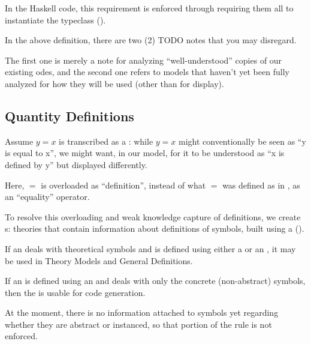 In the Haskell code, this requirement is enforced through requiring them all to
instantiate the \Express{} typeclass ().

\currentModelKindsHaskell{}

In the above \ModelKinds{} definition, there are two (2) TODO notes that you may
disregard.

The first one is merely a note for analyzing ``well-understood'' copies of our
existing \acsp{ode}, and the second one refers to models that haven't yet been
fully analyzed for how they will be used (other than for display).

\subsection{Quantity Definitions}

\currentQDefinitionHaskell{}

Assume \(y = x\) is transcribed as a \RelationConcept{}: while \(y = x\) might
conventionally be seen as ``y is equal to x'', we might want, in our model, for
it to be understood as ``x is defined by y'' but displayed differently.

Here, \(=\) is overloaded as ``definition'', instead of what \(=\) was defined
as in \Expr{}, as an ``equality'' operator.

To resolve this overloading and weak knowledge capture of definitions, we create
\EquationalModel{}s: theories that contain information about definitions of
symbols, built using a \QDefinition{} ().

If an \EquationalModel{} deals with theoretical symbols and is defined using
either a \ModelExpr{} or an \Expr{}, it may be used in Theory Models and General
Definitions.

If an \EquationalModel{} is defined using an \Expr{} and deals with only the
concrete (non-abstract) symbols, then the \EquationalModel{} is usable for code
generation.

At the moment, there is no information attached to symbols yet regarding whether
they are abstract or instanced, so that portion of the rule is not enforced.






